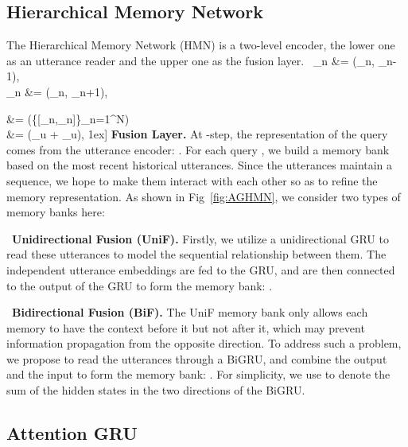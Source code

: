 \documentclass[letterpaper]{article} \usepackage{aaai20}  \usepackage{times}  \usepackage{helvet} \usepackage{courier}  \usepackage[hyphens]{url}  \usepackage{graphicx} \urlstyle{rm} \def\UrlFont{\rm}  \usepackage{graphicx}  \frenchspacing  \setlength{\pdfpagewidth}{8.5in}  \setlength{\pdfpageheight}{11in}
\DeclareMathOperator{\GRU}{\mathbf{GRU}}
\DeclareMathOperator{\maxpool}{maxpool}
\begin{document}
\subsection{Hierarchical Memory Network}
The Hierarchical Memory Network (HMN) is a two-level encoder, the lower one as an utterance reader and the upper one as the fusion layer. 
\
    _{n} &= \overrightarrow{\GRU}(_n, _{n-1}), \\
    _{n} &= \overleftarrow{\GRU}(\mathbf{x}_n, \overleftarrow{\mathbf{h}}_{n+1}),

 &= \maxpool(\{[_{n},_{n}]\}_{n=1}^N) \\
\mathbf{u} &= \tanh(\mathbf{W}_u\overleftrightarrow{\mathbf{h}} + \mathbf{b}_u),
1ex]
\noindent\textbf{Fusion Layer.}
At -step, the representation of the query comes from the utterance encoder: .
For each query , we build a memory bank  based on the most recent  historical utterances. Since the  utterances maintain a sequence, we hope to make them interact with each other so as to refine the memory representation. As shown in Fig~\ref{fig:AGHMN}, we consider two types of memory banks here:

~\textbf{Unidirectional Fusion (UniF).} Firstly, we utilize a unidirectional GRU to read these  utterances to model the sequential relationship between them. The independent utterance embeddings  are fed to the GRU, and are then connected to the output of the GRU to form the memory bank: .

~\textbf{Bidirectional Fusion (BiF).} The UniF memory bank only allows each memory to have the context before it but not after it, which may prevent information propagation from the opposite direction. To address such a problem, we propose to read the  utterances through a BiGRU, and combine the output and the input to form the memory bank: . For simplicity, we use  to denote the sum of the hidden states in the two directions of the BiGRU.


\subsection{Attention GRU}
\end{document}
